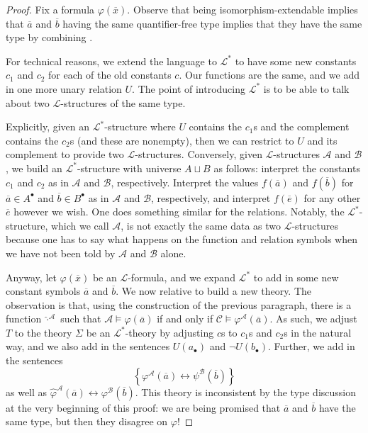 \documentclass[../notes.tex]{subfiles}
\begin{document}
\begin{proof}
	Fix a formula $\varphi(\overline x)$. Observe that being isomorphism-extendable implies that $\overline a$ and $\overline b$ having the same quantifier-free type implies that they have the same type by combining .

	For technical reasons, we extend the language to $\mathcal L^*$ to have some new constants $c_1$ and $c_2$ for each of the old constants $c$. Our functions are the same, and we add in one more unary relation $U$. The point of introducing $\mathcal L^*$ is to be able to talk about two $\mathcal L$-structures of the same type.
	
	Explicitly, given an $\mathcal L^*$-structure where $U$ contains the $c_1$s and the complement contains the $c_2$s (and these are nonempty), then we can restrict to $U$ and its complement to provide two $\mathcal L$-structures. Conversely, given $\mathcal L$-structures $\mathcal A$ and $\mathcal B$, we build an $\mathcal L^*$-structure with universe $A\sqcup B$ as follows: interpret the constants $c_1$ and $c_2$ as in $\mathcal A$ and $\mathcal B$, respectively. Interpret the values $f(\overline a)$ and $f(\overline b)$ for $\overline a\in A^\bullet$ and $\overline b\in B^\bullet$ as in $\mathcal A$ and $\mathcal B$, respectively, and interpret $f(\overline e)$ for any other $\overline e$ however we wish. One does something similar for the relations. Notably, the $\mathcal L^*$-structure, which we call $\mathcal A$, is not exactly the same data as two $\mathcal L$-structures because one has to say what happens on the function and relation symbols when we have not been told by $\mathcal A$ and $\mathcal B$ alone.

	Anyway, let $\varphi(\overline x)$ be an $\mathcal L$-formula, and we expand $\mathcal L^*$ to add in some new constant symbols $\overline a$ and $\overline b$. We now relative to build a new theory. The observation is that, using the construction of the previous paragraph, there is a function $\widehat\cdot^{\mathcal A}$ such that $\mathcal A\models\varphi(\overline a)$ if and only if $\mathcal C\models\varphi^\mathcal A(\overline a)$. As such, we adjust $T$ to the theory $\Sigma$ be an $\mathcal L^*$-theory by adjusting $c$s to $c_1$s and $c_2$s in the natural way, and we also add in the sentences $U(a_\bullet)$ and $\lnot U(b_\bullet)$. Further, we add in the sentences
	\[\left\{\varphi^\mathcal A(\overline a)\leftrightarrow\psi^\mathcal B(\overline b)\right\}\]
	as well as $\widehat\varphi^\mathcal A(\overline a)\leftrightarrow\varphi^\mathcal B(\overline b)$. This theory is inconsistent by the type discussion at the very beginning of this proof: we are being promised that $\overline a$ and $\overline b$ have the same type, but then they disagree on $\varphi$!


\end{proof}
\end{document}

